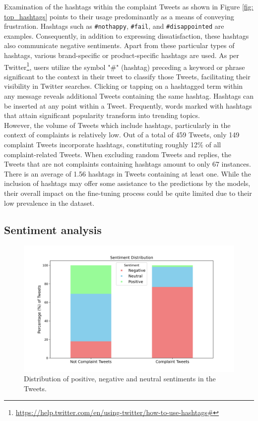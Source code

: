 Examination of the hashtags within the complaint Tweets as shown in Figure \ref{fig: top_hashtags} points to their usage predominantly as a means of conveying frustration. Hashtags such as \texttt{\#nothappy}, \texttt{\#fail}, and \texttt{\#disappointed} are examples. Consequently, in addition to expressing dissatisfaction, these hashtags also communicate negative sentiments. Apart from these particular types of hashtags, various brand-specific or product-specific hashtags are used. As per Twitter\footnote{\url{https://help.twitter.com/en/using-twitter/how-to-use-hashtags#}}, users utilize the symbol "\#" (hashtag) preceding a keyword or phrase significant to the context in their tweet to classify those Tweets, facilitating their visibility in Twitter searches. Clicking or tapping on a hashtagged term within any message reveals additional Tweets containing the same hashtag. Hashtags can be inserted at any point within a Tweet. Frequently, words marked with hashtags that attain significant popularity transform into trending topics. \\

However, the volume of Tweets which include hashtags, particularly in the context of complaints is relatively low. Out of a total of 459 Tweets, only 149 complaint Tweets incorporate hashtags, constituting roughly 12\% of all complaint-related Tweets. When excluding random Tweets and replies, the Tweets that are not complaints containing hashtags amount to only 67 instances. There is an average of 1.56 hashtags in Tweets containing at least one. While the inclusion of hashtags may offer some assistance to the predictions by the models, their overall impact on the fine-tuning process could be quite limited due to their low prevalence in the dataset.\\

\subsection{Sentiment analysis}
\begin{figure}[htb]
    \centering
    \captionsetup{font=small}
    \includegraphics[width=12cm]{figures/sentiment.png}
    \vspace*{-3mm}
    \caption{Distribution of positive, negative and neutral sentiments in the Tweets.}
    \label{fig: sentiment}
\end{figure}

